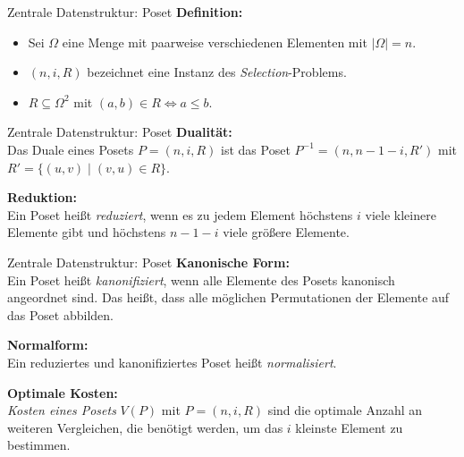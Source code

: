 \sectionframe{\insertsection}

\begin{frame}{Zentrale Datenstruktur: Poset}
  \textbf{Definition:}
  \vspace{1mm}
  \begin{itemize}
    \item Sei $\Omega$ eine Menge mit paarweise verschiedenen Elementen mit $\vert \Omega \vert = n$.
    \item $(n,i,R)$ bezeichnet eine Instanz des \textit{Selection}-Problems.
    \item $R \subseteq \Omega^2$ mit $(a,b) \in R \Leftrightarrow a \leq b$.
  \end{itemize}
  \vspace{2mm}
\end{frame}

\begin{frame}{Zentrale Datenstruktur: Poset}
  \textbf{Dualität:} \\
  \vspace{1mm}
  Das Duale eines Posets $P = (n, i, R)$ ist das Poset $P^{-1} = \left(n, n-1-i, R'\right)$ mit $R' = \{ (u,v) \; \vert \; (v,u) \in R\}$.

  \pause
  \vspace{2mm}
  \textbf{Reduktion:} \\
  \vspace{1mm}
  Ein Poset heißt \textit{reduziert}, wenn es zu jedem Element höchstens $i$ viele kleinere Elemente gibt und höchstens $n-1-i$ viele größere Elemente.
\end{frame}

\begin{frame}{Zentrale Datenstruktur: Poset}
  \textbf{Kanonische Form:} \\
  \vspace{1mm}
  Ein Poset heißt \textit{kanonifiziert}, wenn alle Elemente des Posets kanonisch angeordnet sind. Das heißt, dass alle möglichen Permutationen der Elemente auf das Poset abbilden.

  \pause
  \vspace{2mm}
  \textbf{Normalform:} \\
  \vspace{1mm}
  Ein reduziertes und kanonifiziertes Poset heißt \textit{normalisiert}.

  \pause
  \vspace{2mm}
  \textbf{Optimale Kosten:} \\
  \vspace{1mm}
  \textit{Kosten eines Posets} $V(P)$ mit $P=(n,i,R)$ sind die optimale Anzahl an weiteren Vergleichen, die benötigt werden, um das $i$ kleinste Element zu bestimmen.
\end{frame}

